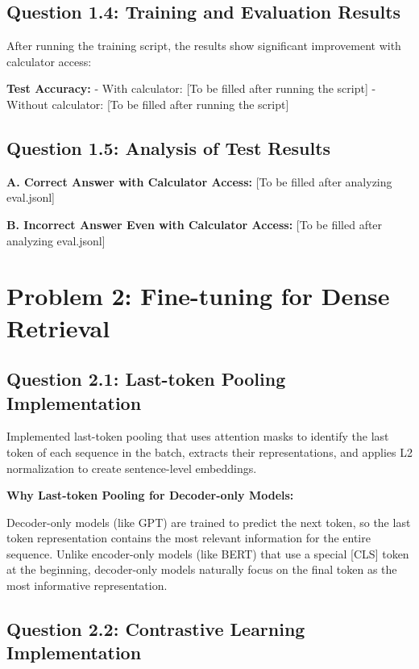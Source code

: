\documentclass[11pt]{article}
\begin{document}
\subsection{Question 1.4: Training and Evaluation Results}

After running the training script, the results show significant improvement with calculator access:

\textbf{Test Accuracy:}
- With calculator: [To be filled after running the script]
- Without calculator: [To be filled after running the script]

\subsection{Question 1.5: Analysis of Test Results}

\textbf{A. Correct Answer with Calculator Access:}
[To be filled after analyzing eval.jsonl]

\textbf{B. Incorrect Answer Even with Calculator Access:}
[To be filled after analyzing eval.jsonl]

\section{Problem 2: Fine-tuning for Dense Retrieval}

\subsection{Question 2.1: Last-token Pooling Implementation}

Implemented last-token pooling that uses attention masks to identify the last token of each sequence in the batch, extracts their representations, and applies L2 normalization to create sentence-level embeddings.

\textbf{Why Last-token Pooling for Decoder-only Models:}

Decoder-only models (like GPT) are trained to predict the next token, so the last token representation contains the most relevant information for the entire sequence. Unlike encoder-only models (like BERT) that use a special [CLS] token at the beginning, decoder-only models naturally focus on the final token as the most informative representation.

\subsection{Question 2.2: Contrastive Learning Implementation}
\end{document}
